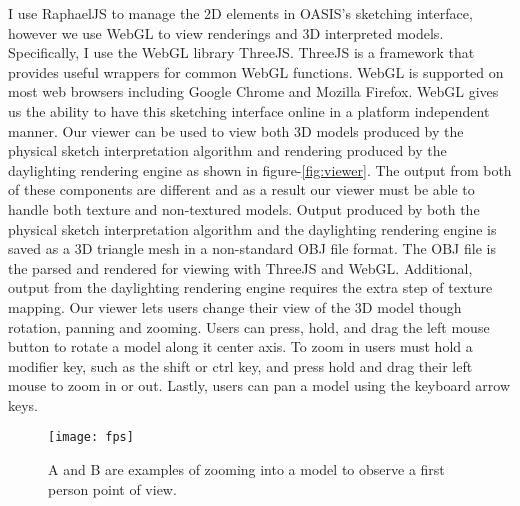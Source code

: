 	I use RaphaelJS to manage the 2D elements in OASIS's sketching interface, however we use WebGL to view renderings and 3D interpreted models. 
	Specifically, I use the WebGL library ThreeJS\cite{}.
	ThreeJS is a framework that provides useful wrappers for common WebGL functions.
	WebGL is supported on most web browsers including Google Chrome and Mozilla Firefox\cite{}.
	WebGL gives us the ability to have this sketching interface online in a platform independent manner.
	Our viewer can be used to view both 3D models produced by the physical sketch interpretation algorithm and rendering produced by the daylighting rendering engine as shown in figure-\ref{fig:viewer}.
	The output from both of these components are different and as a result our viewer must be able to handle both texture and non-textured models.
	Output produced by both the physical sketch interpretation algorithm and the daylighting rendering engine is saved as a 3D triangle mesh in a non-standard OBJ file format.
	The OBJ file is the parsed and rendered for viewing with ThreeJS and WebGL.
	Additional, output from the daylighting rendering engine requires the extra step of texture mapping.
	Our viewer lets users change their view of the 3D model though rotation, panning and zooming. Users can press, hold, and drag  the left mouse button to rotate a model along it center axis.
	To zoom in users must hold a modifier key, such as the shift or ctrl key, and press hold and drag their left mouse to zoom in or out.
	Lastly, users can pan a model using the keyboard arrow keys.

	\begin{figure}[t]
	\centering
	\texttt{[image: fps]}
	\caption{A and B are examples of zooming into a model to observe a first person point of view.}
	\label{fig:fps}
	\end{figure}

